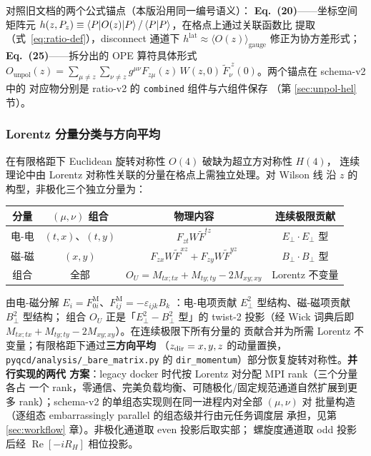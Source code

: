 \documentclass[11pt,a4paper]{ctexart}
\newcommand{\eps}{\varepsilon}
\newcommand{\vev}[1]{\langle #1 \rangle}
\newcommand{\code}[1]{\texttt{#1}}
\begin{document}
对照旧文档的两个公式锚点（本版沿用同一编号语义）：
\textbf{Eq.~(20)}——坐标空间矩阵元
$h(z,P_z)\equiv\braket{P|O(z)|P}/\braket{P|P}$，在格点上通过关联函数比
提取（式~\eqref{eq:ratio-def}），disconnect 通道下
$h^{\text{lat}}\approx\vev{O(z)}_{\text{gauge}}$ 修正为协方差形式；
\textbf{Eq.~(25)}——拆分出的 OPE 算符具体形式
$O_{\text{unpol}}(z)=\sum_{\mu\ne z}\sum_{\nu\ne z}g^{\mu\nu}
F_{z\mu}(z)\,W(z,0)\,\tilde F_\nu^{\;z}(0)$。两个锚点在 schema-v2 中的
对应物分别是 ratio-v2 的 \code{combined} 组件与六组件保存
（第 \ref{sec:unpol-hel} 节）。

\subsubsection{Lorentz 分量分类与方向平均}

在有限格距下 Euclidean 旋转对称性 $O(4)$ 破缺为超立方对称性 $H(4)$，
连续理论中由 Lorentz 对称性关联的分量在格点上需独立处理。对 Wilson 线
沿 $z$ 的构型，非极化三个独立分量为：

\begin{center}
\begin{tabular}{c c c c}
\toprule
\textbf{分量} & \textbf{$(\mu,\nu)$ 组合} & \textbf{物理内容} &
\textbf{连续极限贡献} \\
\midrule
电-电 & $(t,x)$、$(t,y)$ & $F_{zt}W\tilde F^{tz}$ & $E_\perp\cdot E_\perp$ 型 \\
磁-磁 & $(x,y)$ & $F_{zx}W\tilde F^{xz}+F_{zy}W\tilde F^{yz}$ & $B_\perp\cdot B_\perp$ 型 \\
组合 & 全部 & $O_U=M_{tx;tx}+M_{ty;ty}-2M_{xy;xy}$ & Lorentz 不变量 \\
\bottomrule
\end{tabular}
\end{center}
由电-磁分解 $E_i=F^{\mathrm M}_{0i}$、$F^{\mathrm M}_{ij}=-\eps_{ijk}B_k$
：电-电项贡献 $E_\perp^2$ 型结构、磁-磁项贡献 $B_\perp^2$ 型结构；
组合 $O_U$ 正是「$E_\perp^2-B_\perp^2$ 型」的 twist-2 投影（经 Wick
词典后即 $M_{tx;tx}+M_{ty;ty}-2M_{xy;xy}$）。在连续极限下所有分量的
贡献合并为所需 Lorentz 不变量；有限格距下通过\textbf{三方向平均}
（$z_{\rm dir}=x,y,z$ 的动量置换，\code{pyqcd/analysis/\_bare\_matrix.py}
的 \code{dir\_momentum}）部分恢复旋转对称性。\textbf{并行实现的两代
方案}：legacy docker 时代按 Lorentz 对分配 MPI rank（三个分量各占
一个 rank，零通信、完美负载均衡、可随极化/固定规范通道自然扩展到更多
rank）；schema-v2 的单组态实现则在同一进程内对全部 $(\mu,\nu)$ 对
批量构造（逐组态 embarrassingly parallel 的组态级并行由元任务调度层
承担，见第 \ref{sec:workflow} 章）。非极化通道取 even 投影后取实部；
螺旋度通道取 odd 投影后经 $\operatorname{Re}[-iR_H]$ 相位投影。
\end{document}

